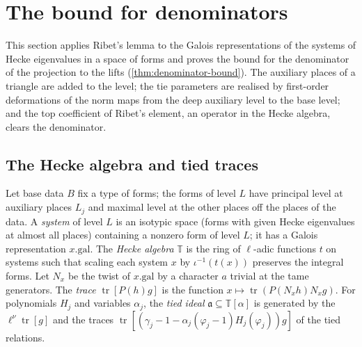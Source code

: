 \section{The bound for denominators}\label{sec:denominators}

This section applies Ribet's lemma to the Galois representations of the systems of Hecke eigenvalues in a space of forms and proves the bound for the denominator of the
projection to the lifts (\cref{thm:denominator-bound}). The auxiliary places of a triangle are added to the level; the tie parameters are realised by first-order
deformations of the norm maps from the deep auxiliary level to the base level; and the top coefficient of Ribet's element, an operator in the Hecke algebra, clears the
denominator.

\subsection{The Hecke algebra and tied traces}\label{ss:tied-traces}
Let base data $B$ fix a type of forms; the forms of level $L$ have principal level at auxiliary places $L_j$ and maximal level at the other places off the places of the data. A \emph{system} of level $L$ is an
isotypic space (forms with given Hecke eigenvalues at almost all places) containing a nonzero form of level $L$; it has a Galois representation $x.\mathrm{gal}$. The \emph{Hecke algebra} $\mathbb T$ is the ring of $\ell$-adic
functions $t$ on systems such that scaling each system $x$ by $\iota^{-1}(t(x))$ preserves the integral forms. Let $N_x$ be the twist of $x.\mathrm{gal}$ by a character $a$ trivial at the tame generators. The \emph{trace}
$\operatorname{tr}[P(h)g]$ is the function $x\mapsto\operatorname{tr}(P(N_xh)N_xg)$. For polynomials $H_j$ and variables $\alpha_j$, the \emph{tied ideal} $\mathfrak a\subseteq\mathbb T[\alpha]$ is generated by the $\ell^\nu\operatorname{tr}[g]$ and the traces
$\operatorname{tr}[(\gamma_j-1-\alpha_j(\varphi_j-1)H_j(\varphi_j))g]$ of the tied relations.
